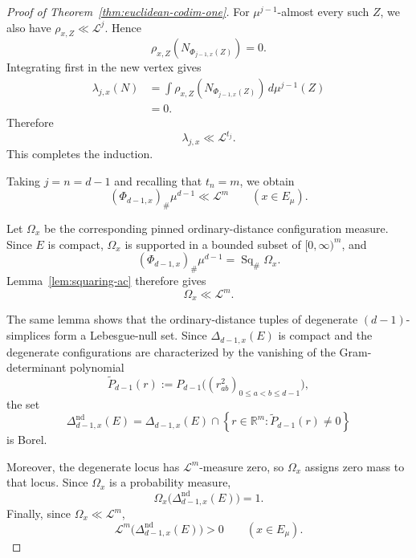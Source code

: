 \documentclass[10pt,a4paper]{amsart}
\newcommand{\R}{\mathbb R}
\newcommand{\cL}{\mathcal L}
\begin{document}
\begin{proof}[Proof of Theorem~\ref{thm:euclidean-codim-one}]
For \(\mu^{j-1}\)-almost every such \(Z\), we also have
\(\rho_{x,Z}\ll\cL^j\). Hence
\[
\rho_{x,Z}
\left(
N_{\Phi_{j-1,x}(Z)}
\right)
=0.
\]
Integrating first in the new vertex gives
\[
\begin{aligned}
\lambda_{j,x}(N)
&=
\int
\rho_{x,Z}
\left(
N_{\Phi_{j-1,x}(Z)}
\right)
\,d\mu^{j-1}(Z)\\
&=0.
\end{aligned}
\]
Therefore
\[
\lambda_{j,x}\ll\cL^{t_j}.
\]
This completes the induction.

Taking \(j=n=d-1\) and recalling that \(t_n=m\), we obtain
\[
(\Phi_{d-1,x})_\#\mu^{d-1}
\ll\cL^m
\qquad
(x\in E_\mu).
\]

Let \(\Omega_x\) be the corresponding pinned ordinary-distance
configuration measure. Since \(E\) is compact, \(\Omega_x\) is
supported in a bounded subset of \([0,\infty)^m\), and
\[
(\Phi_{d-1,x})_\#\mu^{d-1}
=
\operatorname{Sq}_\#\Omega_x.
\]
Lemma~\ref{lem:squaring-ac} therefore gives
\[
\Omega_x\ll\cL^m.
\]

The same lemma shows that the ordinary-distance tuples of degenerate
\((d-1)\)-simplices form a Lebesgue-null set. Since
\(\Delta_{d-1,x}(E)\) is compact and the degenerate configurations are
characterized by the vanishing of the Gram-determinant polynomial
\[
\widetilde P_{d-1}(r)
:=
P_{d-1}
\bigl(
(r_{ab}^2)_{0\leq a<b\leq d-1}
\bigr),
\]
the set
\[
\Delta^{\mathrm{nd}}_{d-1,x}(E)
=
\Delta_{d-1,x}(E)
\cap
\left\{
r\in\R^m:
\widetilde P_{d-1}(r)\neq0
\right\}
\]
is Borel.

Moreover, the degenerate locus has \(\cL^m\)-measure zero, so
\(\Omega_x\) assigns zero mass to that locus. Since \(\Omega_x\) is a
probability measure,
\[
\Omega_x
\bigl(
\Delta^{\mathrm{nd}}_{d-1,x}(E)
\bigr)
=
1.
\]
Finally, since \(\Omega_x\ll\cL^m\),
\[
\cL^m
\bigl(
\Delta^{\mathrm{nd}}_{d-1,x}(E)
\bigr)
>0
\qquad
(x\in E_\mu).
\]
\end{proof}
\end{document}
